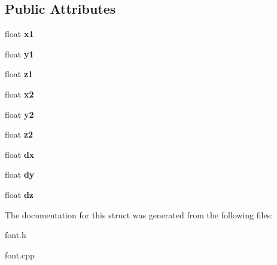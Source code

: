 \subsection*{Public Attributes}
\begin{DoxyCompactItemize}
\item 
\hypertarget{structtextquad_aa0712627d76a8d162e00645f56286de9}{float {\bfseries x1}}\label{structtextquad_aa0712627d76a8d162e00645f56286de9}

\item 
\hypertarget{structtextquad_aae86fe50b0bb27b5f82dcf26d34f395a}{float {\bfseries y1}}\label{structtextquad_aae86fe50b0bb27b5f82dcf26d34f395a}

\item 
\hypertarget{structtextquad_ac54c4d11a48300b0119298317d730fd4}{float {\bfseries z1}}\label{structtextquad_ac54c4d11a48300b0119298317d730fd4}

\item 
\hypertarget{structtextquad_ac3d5057748a416b2807666bbfb74b8cc}{float {\bfseries x2}}\label{structtextquad_ac3d5057748a416b2807666bbfb74b8cc}

\item 
\hypertarget{structtextquad_a4f9ed1b166d9d6833a857e10b582b582}{float {\bfseries y2}}\label{structtextquad_a4f9ed1b166d9d6833a857e10b582b582}

\item 
\hypertarget{structtextquad_a9dd8e2ac5ba0c3587384eca32b6d789f}{float {\bfseries z2}}\label{structtextquad_a9dd8e2ac5ba0c3587384eca32b6d789f}

\item 
\hypertarget{structtextquad_a8c8cb7b7a0b06e137481614692677b2c}{float {\bfseries dx}}\label{structtextquad_a8c8cb7b7a0b06e137481614692677b2c}

\item 
\hypertarget{structtextquad_a4b14cf2bee92820e3d54143010165279}{float {\bfseries dy}}\label{structtextquad_a4b14cf2bee92820e3d54143010165279}

\item 
\hypertarget{structtextquad_a0ba11d5b560b42898a3d39a885b46bac}{float {\bfseries dz}}\label{structtextquad_a0ba11d5b560b42898a3d39a885b46bac}

\end{DoxyCompactItemize}


The documentation for this struct was generated from the following files\-:\begin{DoxyCompactItemize}
\item 
font.\-h\item 
font.\-cpp\end{DoxyCompactItemize}
